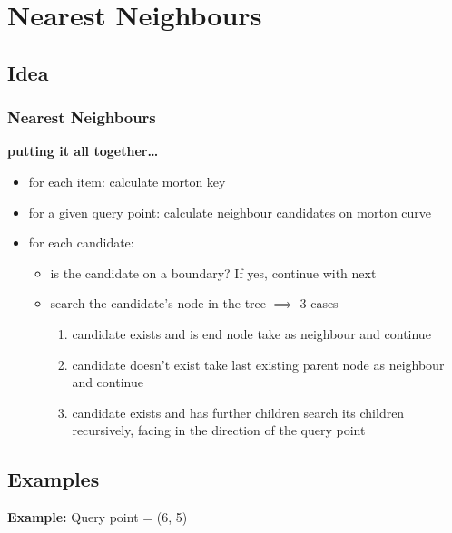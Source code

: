 \section{Nearest Neighbours}
\subsection{Idea}
\begin{frame}
    \frametitle{Nearest Neighbours}
    \textbf{putting it all together\dots}
    \begin{itemize}
        \item for each item: calculate morton key \\
        \item for a given query point: calculate neighbour candidates on morton
            curve \\
        \item for each candidate: \\
        \begin{itemize}
            \item is the candidate on a boundary? If yes, continue with next \\
            \item search the candidate's node in the tree $\implies$ 3 cases \\
            \begin{enumerate}
                \item candidate exists and is end node \textrightarrow take as
                    neighbour and continue \\
                \item candidate doesn't exist \textrightarrow take last
                    existing parent node as neighbour and continue \\
                \item candidate exists and has further children \textrightarrow
                    search its children recursively, facing in the direction of
                    the query point
            \end{enumerate}
        \end{itemize}
    \end{itemize}
\end{frame}

\subsection{Examples}
\begin{frame}
    \textbf{Example:} Query point = (6, 5)
    \begin{figure}
        \centering
        \begin{animateinline}[controls={step,play,stop},buttonsize=10pt]{1}
        \end{animateinline}
    \end{figure}
\end{frame}

